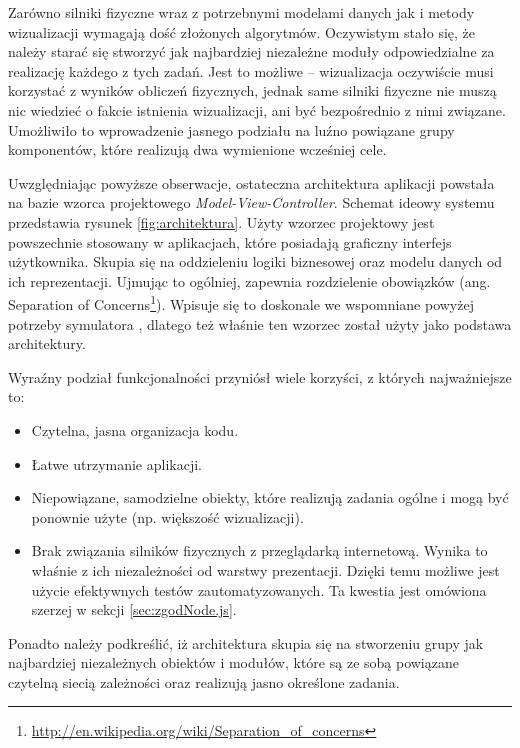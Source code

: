 Zarówno silniki fizyczne wraz z potrzebnymi modelami danych jak i metody
wizualizacji wymagają dość złożonych algorytmów. Oczywistym stało się, że
należy starać się stworzyć jak najbardziej niezależne moduły odpowiedzialne za
realizację każdego z tych zadań. Jest to możliwe -- wizualizacja oczywiście
musi korzystać z wyników obliczeń fizycznych, jednak same silniki fizyczne nie
muszą nic wiedzieć o fakcie istnienia wizualizacji, ani być bezpośrednio z
nimi związane. Umożliwiło to wprowadzenie jasnego podziału na luźno powiązane
grupy komponentów, które realizują dwa wymienione wcześniej cele.

Uwzględniając powyższe obserwacje, ostateczna architektura aplikacji powstała na
bazie wzorca projektowego \emph{Model-View-Controller}. Schemat ideowy systemu
\en przedstawia rysunek \ref{fig:architektura}. Użyty wzorzec projektowy jest
powszechnie stosowany w aplikacjach, które posiadają graficzny interfejs
użytkownika. Skupia się na oddzieleniu logiki biznesowej oraz modelu danych od
ich reprezentacji. Ujmując to ogólniej, zapewnia rozdzielenie obowiązków (ang.
Separation of
Concerns\footnote{\url{http://en.wikipedia.org/wiki/Separation_of_concerns}}).
Wpisuje się to doskonale we wspomniane powyżej potrzeby symulatora \en, dlatego
też właśnie ten wzorzec został użyty jako podstawa architektury.

Wyraźny podział funkcjonalności przyniósł wiele korzyści, z których
najważniejsze to:

\begin{itemize}
\item Czytelna, jasna organizacja kodu.

\item Łatwe utrzymanie aplikacji.

\item Niepowiązane, samodzielne obiekty, które realizują zadania ogólne i mogą
być ponownie użyte (np. większość wizualizacji).

\item Brak związania silników fizycznych z przeglądarką internetową. Wynika to
właśnie z ich niezależności od warstwy prezentacji. Dzięki temu możliwe jest użycie
efektywnych testów zautomatyzowanych. Ta kwestia jest omówiona szerzej w sekcji
\ref{sec:zgodNode.js}.

\end{itemize}

Ponadto należy podkreślić, iż architektura \en skupia się na stworzeniu grupy
jak najbardziej niezależnych obiektów i modułów, które są ze sobą powiązane
czytelną siecią zależności oraz realizują jasno określone zadania.

